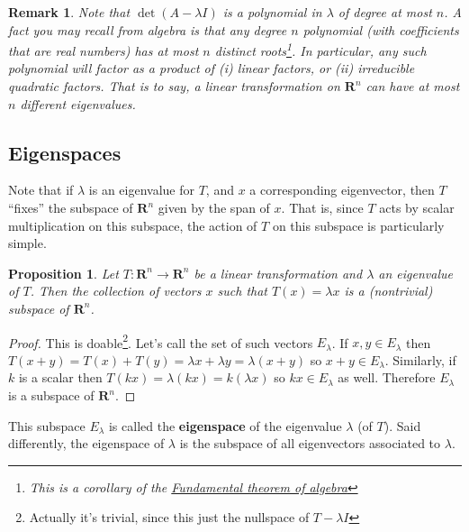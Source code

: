 \documentclass[12pt]{article}
\numberwithin{equation}{subsection}
\numberwithin{figure}{subsection}
\newtheorem{prop}[subsection]{Proposition}
\theoremstyle{note}
\newtheorem{remark}[subsection]{Remark}
\begin{document}
\begin{remark}
	Note that $\det(A-\lambda I)$ is a polynomial in $\lambda$ of degree at most $n$. A fact you may recall from algebra is that any degree $n$ polynomial (with coefficients that are real numbers) has at most $n$ distinct roots\footnote{This is a corollary of the \href{https://en.wikipedia.org/wiki/Fundamental_theorem_of_algebra.}{Fundamental theorem of algebra}}. In particular, any such polynomial will factor as a product of (i) linear factors, or (ii) irreducible quadratic factors. That is to say, a linear transformation on $\mathbf{R}^n$ can have at most $n$ different eigenvalues. 
	
\end{remark}	


\subsection{Eigenspaces}
Note that if $\lambda$ is an eigenvalue for $T$, and $x$ a corresponding eigenvector, then $T$ ``fixes'' the subspace of $\mathbf{R}^n$ given by the span of $x$. That is, since $T$ acts by scalar multiplication on this subspace, the action of $T$ on this subspace is particularly simple.

\begin{prop} Let $T\colon\mathbf{R}^n\to\mathbf{R}^n$ be a linear transformation and $\lambda$ an eigenvalue of $T$. Then the collection of vectors $x$ such that $T(x)=\lambda x$ is a (nontrivial) subspace of $\mathbf{R}^n$.
\end{prop}
\begin{proof}
	This is doable\footnote{Actually it's trivial, since this just the nullspace of $T-\lambda I$}. Let's call the set of such vectors $E_{\lambda}$. If $x,y\in E_{\lambda}$ then $T(x+y)=T(x)+T(y)=\lambda x+\lambda y=\lambda (x+y)$ so $x+y\in E_{\lambda}$. Similarly, if $k$ is a scalar then $T(k x)=\lambda (kx)=k(\lambda x)$ so $kx\in E_{\lambda}$ as well. Therefore $E_{\lambda}$ is a subspace of $\mathbf{R}^n$.
\end{proof}

This subspace $E_{\lambda}$ is called the \textbf{eigenspace} of the eigenvalue $\lambda$ (of $T$). Said differently, the eigenspace of $\lambda$ is the subspace of all eigenvectors associated to $\lambda$. 
\end{document}
